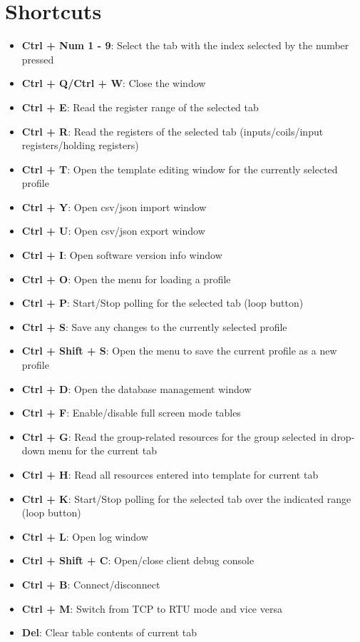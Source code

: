 
\chapter{Shortcuts}

\begin{itemize}
\item \textbf{Ctrl + Num 1 - 9}: Select the tab with the index selected by the number pressed
\item \textbf{Ctrl + Q/Ctrl + W}: Close the window
\item \textbf{Ctrl + E}: Read the register range of the selected tab
\item \textbf{Ctrl + R}: Read the registers of the selected tab (inputs/coils/input registers/holding registers)
\item \textbf{Ctrl + T}: Open the template editing window for the currently selected profile
\item \textbf{Ctrl + Y}: Open csv/json import window
\item \textbf{Ctrl + U}: Open csv/json export window
\item \textbf{Ctrl + I}: Open software version info window
\item \textbf{Ctrl + O}: Open the menu for loading a profile
\item \textbf{Ctrl + P}: Start/Stop polling for the selected tab (loop button)
\item \textbf{Ctrl + S}: Save any changes to the currently selected profile
\item \textbf{Ctrl + Shift + S}: Open the menu to save the current profile as a new profile
\item \textbf{Ctrl + D}: Open the database management window
\item \textbf{Ctrl + F}: Enable/disable full screen mode tables
\item \textbf{Ctrl + G}: Read the group-related resources for the group selected in drop-down menu for the current tab
\item \textbf{Ctrl + H}: Read all resources entered into template for current tab
\item \textbf{Ctrl + K}: Start/Stop polling for the selected tab over the indicated range (loop button)
\item \textbf{Ctrl + L}: Open log window
\item \textbf{Ctrl + Shift + C}: Open/close client debug console
\item \textbf{Ctrl + B}: Connect/disconnect
\item \textbf{Ctrl + M}: Switch from TCP to RTU mode and vice versa
\item \textbf{Del}: Clear table contents of current tab
\end{itemize}